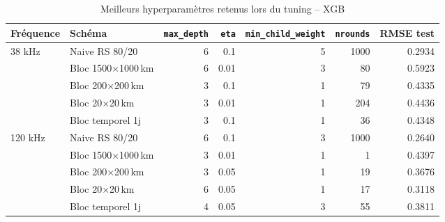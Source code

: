 \begin{table}[htbp]
\centering
\caption{Meilleurs hyperparam\`etres retenus lors du tuning -- XGB}
\label{tab:tuning_summary_xgb}
\small
\begin{tabularx}{\textwidth}{l l r r r r r}
\toprule
Fr\'equence & Sch\'ema & \texttt{max\_depth} & \texttt{eta} & \texttt{min\_child\_weight} & \texttt{nrounds} & RMSE test \\
\midrule
38 kHz & Naive RS 80/20 &     6 &   0.1 &     5 &  1000 & 0.2934 \\
 & Bloc 1500$\times$1000\,km &     6 &  0.01 &     3 &    80 & 0.5923 \\
 & Bloc 200$\times$200\,km &     3 &   0.1 &     1 &    79 & 0.4335 \\
 & Bloc 20$\times$20\,km &     3 &  0.01 &     1 &   204 & 0.4436 \\
 & Bloc temporel 1j &     3 &   0.1 &     1 &    36 & 0.4348 \\
\midrule
120 kHz & Naive RS 80/20 &     6 &   0.1 &     3 &  1000 & 0.2640 \\
 & Bloc 1500$\times$1000\,km &     3 &  0.01 &     1 &     1 & 0.4397 \\
 & Bloc 200$\times$200\,km &     3 &  0.05 &     1 &    19 & 0.3676 \\
 & Bloc 20$\times$20\,km &     6 &  0.05 &     1 &    17 & 0.3118 \\
 & Bloc temporel 1j &     4 &  0.05 &     3 &    55 & 0.3811 \\
\bottomrule
\end{tabularx}
\end{table}
